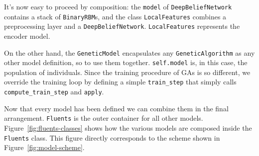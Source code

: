 It's now easy to proceed by composition: the \texttt{model} of
\texttt{DeepBeliefNetwork} contains a stack of \texttt{BinaryRBM}s, and the
class \texttt{LocalFeatures} combines a preprocessing layer and a
\texttt{DeepBeliefNetwork}. \texttt{LocalFeatures} represents the encoder
model.

On the other hand, the \texttt{GeneticModel} encapsulates any
\texttt{GeneticAlgorithm} as any other model definition, so to use them
together. \verb|self.model| is, in this case, the population of individuals.
Since the training procedure of GAs is so different, we override the training
loop by defining a simple \verb|train_step| that simply calls
\verb|compute_train_step| and \verb|apply|.

Now that every model has been defined we can combine them in the final
arrangement. \texttt{Fluents} is the outer container for all other models.
Figure~\ref{fig:fluents-classes} shows how the various models are composed
inside the \texttt{Fluents} class. This figure directly corresponds to the
scheme shown in Figure~\vref{fig:model-scheme}.
